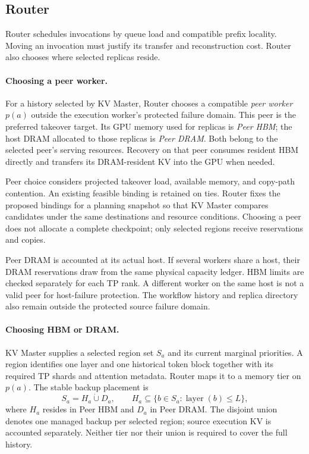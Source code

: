 \subsection{Router}
\label{sec:teacher-router}

Router schedules invocations by queue load and compatible prefix
locality. Moving an invocation must justify its transfer and
reconstruction cost. Router also chooses where selected replicas reside.

\paragraph{Choosing a peer worker.}
For a history selected by KV Master, Router chooses a compatible
\emph{peer worker} $p(a)$ outside the execution worker's protected
failure domain. This peer is the preferred takeover target. Its GPU
memory used for replicas is \emph{Peer HBM}; the host DRAM allocated to
those replicas is \emph{Peer DRAM}. Both belong to the selected peer's
serving resources. Recovery on that peer consumes resident HBM directly
and transfers its DRAM-resident KV into the GPU when needed.

Peer choice considers projected takeover load, available memory, and
copy-path contention. An existing feasible binding is retained on ties.
Router fixes the proposed bindings for a planning snapshot so that KV
Master compares candidates under the same destinations and resource
conditions. Choosing a peer does not allocate a complete checkpoint;
only selected regions receive reservations and copies.

Peer DRAM is accounted at its actual host. If several workers share a
host, their DRAM reservations draw from the same physical capacity
ledger. HBM limits are checked separately for each TP rank. A different
worker on the same host is not a valid peer for host-failure protection.
The workflow history and replica directory also remain outside the
protected source failure domain.

\paragraph{Choosing HBM or DRAM.}
KV Master supplies a selected region set $S_a$ and its current marginal
priorities. A region identifies one layer and one historical token block
together with its required TP shards and attention metadata. Router
maps it to a memory tier on $p(a)$. The stable backup placement is
\begin{equation}
 S_a=H_a\mathbin{\dot\cup}D_a,\qquad
 H_a\subseteq\{b\in S_a:\operatorname{layer}(b)\le L\},
 \label{eq:teacher-placement}
\end{equation}
where $H_a$ resides in Peer HBM and $D_a$ in Peer DRAM. The disjoint
union denotes one managed backup per selected region; source execution
KV is accounted separately. Neither tier nor their union is required
to cover the full history.

